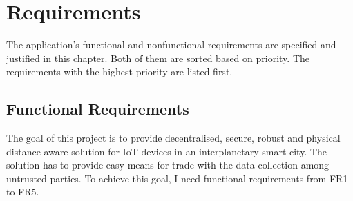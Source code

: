 
\chapter{Requirements\label{chap:requirements}}
The application's functional and nonfunctional requirements are specified and justified in this chapter. Both of them are sorted based on priority. The requirements with the highest priority are listed first.

\section{Functional Requirements}
\quad The goal of this project is to provide decentralised, secure, robust and physical distance aware solution for IoT devices in an interplanetary smart city. The solution has to provide easy means for trade with the data collection among untrusted parties. To achieve this goal, I need functional requirements from FR1 to FR5.

